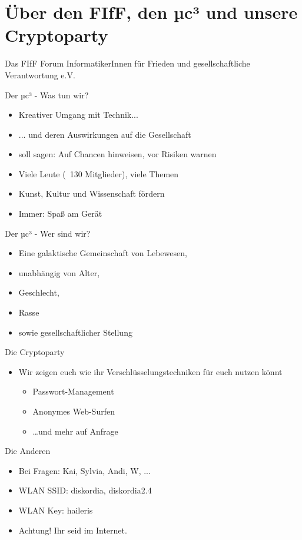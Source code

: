 \section{Über den FIfF, den µc³ und unsere Cryptoparty}
  \begin{frame}{Das FIfF}
    Forum InformatikerInnen für Frieden und gesellschaftliche Verantwortung e.V.
  \end{frame}
  \begin{frame}{Der µc³ - Was tun wir?}
    \begin{itemize}
      \item{Kreativer Umgang mit Technik...}
      \item{... und deren Auswirkungen auf die Gesellschaft}
      \item{soll sagen: Auf Chancen hinweisen, vor Risiken warnen}
      \item{Viele Leute (~130 Mitglieder), viele Themen}
      \item{Kunst, Kultur und Wissenschaft fördern}
      \item{Immer: Spaß am Gerät}
    \end{itemize}
  \end{frame}
  \begin{frame}{Der µc³ - Wer sind wir?}
    \begin{itemize}
      \item{Eine galaktische Gemeinschaft von Lebewesen,}
      \item{unabhängig von Alter,}
      \item{Geschlecht,}
      \item{Rasse}
      \item{sowie gesellschaftlicher Stellung}
    \end{itemize}
  \end{frame}
  \begin{frame}{Die Cryptoparty}
    \begin{itemize}
      \item{Wir zeigen euch wie ihr Verschlüsselungstechniken für euch nutzen könnt}
      \begin{itemize}
        \item{Passwort-Management}
        \item{Anonymes Web-Surfen}
        \item{\ldots und mehr auf Anfrage}
      \end{itemize}
    \end{itemize}
  \end{frame}
  \begin{frame}{Die Anderen}
    \begin{itemize}
      \item{Bei Fragen: Kai, Sylvia, Andi, W, ...}
      \item{WLAN SSID: diskordia, diskordia2.4}
      \item{WLAN Key: haileris}
      \item{Achtung! Ihr seid im Internet.}
    \end{itemize}
  \end{frame}


